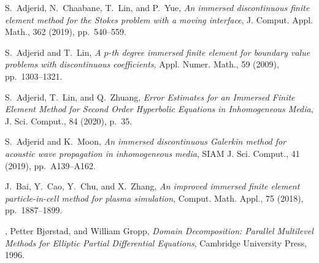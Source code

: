 \documentclass{siamart171218}
\begin{document}
\clearpage



\begin{thebibliography}{99}

{\sc S.~Adjerid, N.~Chaabane, T.~Lin, and P.~Yue}, {\em An immersed
  discontinuous finite element method for the {S}tokes problem with a moving
  interface}, J. Comput. Appl. Math., 362 (2019), pp.~540--559.

{\sc S.~Adjerid and T.~Lin}, {\em A {$p$}-th degree immersed finite element for
  boundary value problems with discontinuous coefficients}, Appl. Numer. Math.,
  59 (2009), pp.~1303--1321.

{\sc S.~Adjerid, T.~Lin, and Q.~Zhuang}, {\em Error {E}stimates for an
  {I}mmersed {F}inite {E}lement {M}ethod for {S}econd {O}rder {H}yperbolic
  {E}quations in {I}nhomogeneous {M}edia}, J. Sci. Comput., 84 (2020), p.~35.

{\sc S.~Adjerid and K.~Moon}, {\em An immersed discontinuous {G}alerkin method
  for acoustic wave propagation in inhomogeneous media}, SIAM J. Sci. Comput.,
  41 (2019), pp.~A139--A162.

{\sc J.~Bai, Y.~Cao, Y.~Chu, and X.~Zhang}, {\em An improved immersed finite
  element particle-in-cell method for plasma simulation}, Comput. Math. Appl.,
  75 (2018), pp.~1887--1899.

{, {Petter Bj{\o}rstad}, and {William Gropp}}, {\em Domain
  Decomposition: Parallel Multilevel Methods for Elliptic Partial Differential
  Equations}, Cambridge University Press, 1996.


\end{thebibliography}
\end{document}
